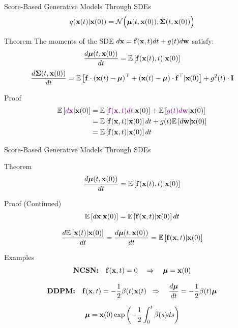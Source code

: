 \documentclass{beamer}
\renewcommand{\eqpause}{}
\renewcommand{\nextonslide}[1]{#1}
\begin{document}
\begin{frame}{Score-Based Generative Models Through SDEs}
	\[
		q(\mathbf{x}(t) | \mathbf{x}(0)) = \mathcal{N}\Bigl(\boldsymbol{\mu}(t, \mathbf{x}(0)), \boldsymbol{\Sigma}(t, \mathbf{x}(0))\Bigr)
	\]
	\vspace{-0.5cm}
	\begin{block}{Theorem}
		The moments of the SDE $d\mathbf{x} = \mathbf{f}(\mathbf{x}, t) dt + g(t) d \mathbf{w}$ satisfy:
		\[
			\frac{d \boldsymbol{\mu}(t, \mathbf{x}(0))}{dt} = \mathbb{E} \left[ \mathbf{f}(\mathbf{x}(t), t) | \mathbf{x}(0)\right]
		\]
		\[
			\frac{d \boldsymbol{\Sigma}(t, \mathbf{x}(0))}{dt} = \mathbb{E} \left[ \mathbf{f} \cdot (\mathbf{x}(t) - \boldsymbol{\mu})^\top + (\mathbf{x}(t) - \boldsymbol{\mu}) \cdot \mathbf{f}^\top | \mathbf{x}(0)\right] + g^2(t) \cdot \mathbf{I}
		\]
	\end{block}
    \eqpause
	\begin{block}{Proof}
		\vspace{-0.7cm}
		\begin{align*}
			\bbE\left[{\color{violet}d\bx} | \bx(0) \right] &= \bbE\left[{\color{violet}\bff(\bx, t) dt} | \bx(0) \right] + \bbE\left[{\color{violet}g(t) d \bw} | \bx(0) \right]
			\nextonslide{\\ &= \bbE\left[\bff(\bx, t) | \bx(0) \right] dt + g(t) \bbE\left[d \bw | \bx(0) \right]}
			\nextonslide{\\ &= \bbE\left[\bff(\bx, t) | \bx(0) \right] dt}
		\end{align*}
	\end{block}
\end{frame}
\begin{frame}{Score-Based Generative Models Through SDEs}
	\begin{block}{Theorem}
		\vspace{-0.3cm}
		\[
			\frac{d \boldsymbol{\mu}(t, \mathbf{x}(0))}{dt} = \mathbb{E} \left[ \mathbf{f}(\mathbf{x}(t), t) | \mathbf{x}(0)\right]
		\]
		\vspace{-0.5cm}
	\end{block}
    \eqpause
	\begin{block}{Proof (Continued)}
		\vspace{-0.3cm}
		\[
			\mathbb{E}\left[d\mathbf{x} | \mathbf{x}(0) \right] = \mathbb{E}\left[\mathbf{f}(\mathbf{x}, t) | \mathbf{x}(0) \right] dt
		\]
        \eqpause
		\[
			\frac{d \mathbb{E}\left[\mathbf{x}(t) | \mathbf{x}(0) \right]}{dt} = \frac{d \boldsymbol{\mu}(t, \mathbf{x}(0))}{dt} = \mathbb{E}\left[\mathbf{f}(\mathbf{x}, t) | \mathbf{x}(0) \right] 
		\]
	\end{block}
    \eqpause
	\vspace{-0.3cm}
	\begin{block}{Examples}
		\vspace{-0.5cm}
		\[
			\textbf{NCSN:}\quad	\mathbf{f}(\mathbf{x}, t) = 0 \quad \Rightarrow \quad \boldsymbol{\mu} = \mathbf{x}(0)
		\]
        \eqpause
		\vspace{-0.5cm}
		\[
			\textbf{DDPM:}\quad \mathbf{f}(\mathbf{x}, t) = - \frac{1}{2} \beta(t) \mathbf{x}(t)\;\;   \Rightarrow\quad \frac{d \boldsymbol{\mu}}{dt} = - \frac{1}{2} \beta(t) \boldsymbol{\mu}
		\]
        \eqpause
		\vspace{-0.3cm}
		\[
			\boldsymbol{\mu} = \mathbf{x}(0) \exp\left(- \frac{1}{2} \int_0^t \beta(s)ds\right)
		\]
	\end{block}
\end{frame}
\end{document}
